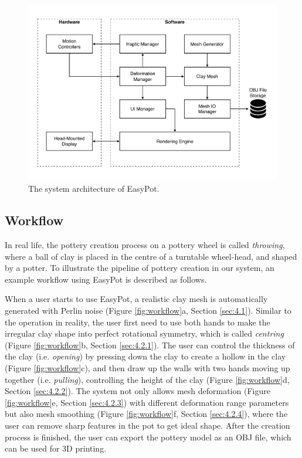 \documentclass{svjour3}                     %
\begin{document}
\begin{figure}
\includegraphics[width=\textwidth]{fig2}
\caption{The system architecture of EasyPot.}
\label{fig:arc}
\end{figure}



\subsection{Workflow}
\label{sec:3.2}
In real life, the pottery creation process on a pottery wheel is called \textit{throwing}, where a ball of clay is placed in the centre of a turntable wheel-head, and shaped by a potter.
To illustrate the pipeline of pottery creation in our system, an example workflow using EasyPot is described as follows.

When a user starts to use EasyPot, a realistic clay mesh is automatically generated with Perlin noise (Figure \ref{fig:workflow}a, Section \ref{sec:4.1}). 
Similar to the operation in reality, the user first need to use both hands to make the irregular clay shape into perfect rotational symmetry, which is called \textit{centring} (Figure \ref{fig:workflow}b, Section \ref{sec:4.2.1}).
The user can control the thickness of the clay (i.e. \textit{opening}) by pressing down the clay to create a hollow in the clay (Figure \ref{fig:workflow}c), 
and then draw up the walls with two hands moving up together (i.e. \textit{pulling}), controlling the height of the clay (Figure \ref{fig:workflow}d, Section \ref{sec:4.2.2}).
The system not only allows mesh deformation (Figure \ref{fig:workflow}e, Section \ref{sec:4.2.3}) with different deformation range parameters but also mesh smoothing (Figure \ref{fig:workflow}f, Section \ref{sec:4.2.4}), where the user can remove sharp features in the pot to get ideal shape.
After the creation process is finished, the user can export the pottery model as an OBJ file, which can be used for 3D printing.
\end{document}
